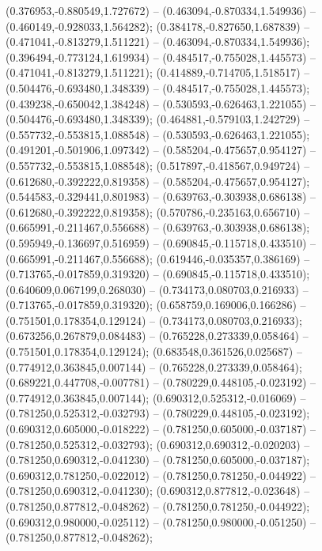  (0.376953,-0.880549,1.727672) -- (0.463094,-0.870334,1.549936) -- (0.460149,-0.928033,1.564282);
 (0.384178,-0.827650,1.687839) -- (0.471041,-0.813279,1.511221) -- (0.463094,-0.870334,1.549936);
 (0.396494,-0.773124,1.619934) -- (0.484517,-0.755028,1.445573) -- (0.471041,-0.813279,1.511221);
 (0.414889,-0.714705,1.518517) -- (0.504476,-0.693480,1.348339) -- (0.484517,-0.755028,1.445573);
 (0.439238,-0.650042,1.384248) -- (0.530593,-0.626463,1.221055) -- (0.504476,-0.693480,1.348339);
 (0.464881,-0.579103,1.242729) -- (0.557732,-0.553815,1.088548) -- (0.530593,-0.626463,1.221055);
 (0.491201,-0.501906,1.097342) -- (0.585204,-0.475657,0.954127) -- (0.557732,-0.553815,1.088548);
 (0.517897,-0.418567,0.949724) -- (0.612680,-0.392222,0.819358) -- (0.585204,-0.475657,0.954127);
 (0.544583,-0.329441,0.801983) -- (0.639763,-0.303938,0.686138) -- (0.612680,-0.392222,0.819358);
 (0.570786,-0.235163,0.656710) -- (0.665991,-0.211467,0.556688) -- (0.639763,-0.303938,0.686138);
 (0.595949,-0.136697,0.516959) -- (0.690845,-0.115718,0.433510) -- (0.665991,-0.211467,0.556688);
 (0.619446,-0.035357,0.386169) -- (0.713765,-0.017859,0.319320) -- (0.690845,-0.115718,0.433510);
 (0.640609,0.067199,0.268030) -- (0.734173,0.080703,0.216933) -- (0.713765,-0.017859,0.319320);
 (0.658759,0.169006,0.166286) -- (0.751501,0.178354,0.129124) -- (0.734173,0.080703,0.216933);
 (0.673256,0.267879,0.084483) -- (0.765228,0.273339,0.058464) -- (0.751501,0.178354,0.129124);
 (0.683548,0.361526,0.025687) -- (0.774912,0.363845,0.007144) -- (0.765228,0.273339,0.058464);
 (0.689221,0.447708,-0.007781) -- (0.780229,0.448105,-0.023192) -- (0.774912,0.363845,0.007144);
 (0.690312,0.525312,-0.016069) -- (0.781250,0.525312,-0.032793) -- (0.780229,0.448105,-0.023192);
 (0.690312,0.605000,-0.018222) -- (0.781250,0.605000,-0.037187) -- (0.781250,0.525312,-0.032793);
 (0.690312,0.690312,-0.020203) -- (0.781250,0.690312,-0.041230) -- (0.781250,0.605000,-0.037187);
 (0.690312,0.781250,-0.022012) -- (0.781250,0.781250,-0.044922) -- (0.781250,0.690312,-0.041230);
 (0.690312,0.877812,-0.023648) -- (0.781250,0.877812,-0.048262) -- (0.781250,0.781250,-0.044922);
 (0.690312,0.980000,-0.025112) -- (0.781250,0.980000,-0.051250) -- (0.781250,0.877812,-0.048262);
